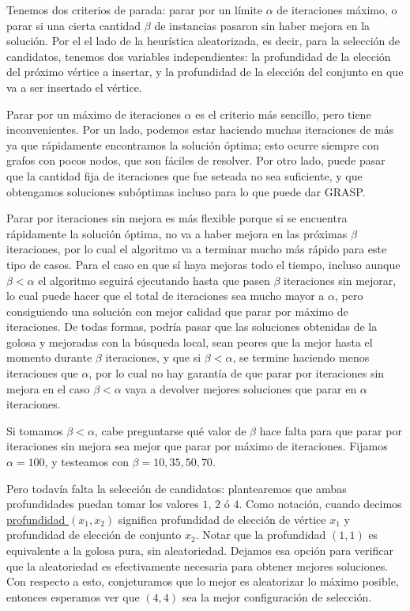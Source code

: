 Tenemos dos criterios de parada: parar por un límite $\alpha$ de iteraciones máximo, o parar si una cierta cantidad $\beta$ de instancias pasaron sin haber mejora en la solución. Por el el lado de la heurística aleatorizada, es decir, para la selección de candidatos, tenemos dos variables independientes: la profundidad de la elección del próximo vértice a insertar, y la profundidad de la elección del conjunto en que va a ser insertado el vértice.

Parar por un máximo de iteraciones $\alpha$ es el criterio más sencillo, pero tiene inconvenientes. Por un lado, podemos estar haciendo muchas iteraciones de más ya que rápidamente encontramos la solución óptima; esto ocurre siempre con grafos con pocos nodos, que son fáciles de resolver. Por otro lado, puede pasar que la cantidad fija de iteraciones que fue seteada no sea suficiente, y que obtengamos soluciones subóptimas incluso para lo que puede dar GRASP.

Parar por iteraciones sin mejora es más flexible porque si se encuentra rápidamente la solución óptima, no va a haber mejora en las próximas $\beta$ iteraciones, por lo cual el algoritmo va a terminar mucho más rápido para este tipo de casos. Para el caso en que sí haya mejoras todo el tiempo, incluso aunque $\beta < \alpha$ el algoritmo seguirá ejecutando hasta que pasen $\beta$ iteraciones sin mejorar, lo cual puede hacer que el total de iteraciones sea mucho mayor a $\alpha$, pero consiguiendo una solución con mejor calidad que parar por máximo de iteraciones. De todas formas, podría pasar que las soluciones obtenidas de la golosa y mejoradas con la búsqueda local, sean peores que la mejor hasta el momento durante $\beta$ iteraciones, y que si $\beta < \alpha$, se termine haciendo menos iteraciones que $\alpha$, por lo cual no hay garantía de que parar por iteraciones sin mejora en el caso $\beta < \alpha$ vaya a devolver mejores soluciones que parar en $\alpha$ iteraciones.

Si tomamos $\beta < \alpha$, cabe preguntarse qué valor de $\beta$ hace falta para que parar por iteraciones sin mejora sea mejor que parar por máximo de iteraciones. Fijamos $\alpha = 100$, y testeamos con $\beta = 10, 35, 50, 70$.

Pero todavía falta la selección de candidatos: plantearemos que ambas profundidades puedan tomar los valores $1$, $2$ ó $4$. Como notación, cuando decimos \underline{profundidad $(x_1,x_2)$} significa profundidad de elección de vértice $x_1$ y profundidad de elección de conjunto $x_2$. Notar que la profundidad $(1,1)$ es equivalente a la golosa pura, sin aleatoriedad. Dejamos esa opción para verificar que la aleatoriedad es efectivamente necesaria para obtener mejores soluciones. Con respecto a esto, conjeturamos que lo mejor es aleatorizar lo máximo posible, entonces esperamos ver que $(4,4)$ sea la mejor configuración de selección.

